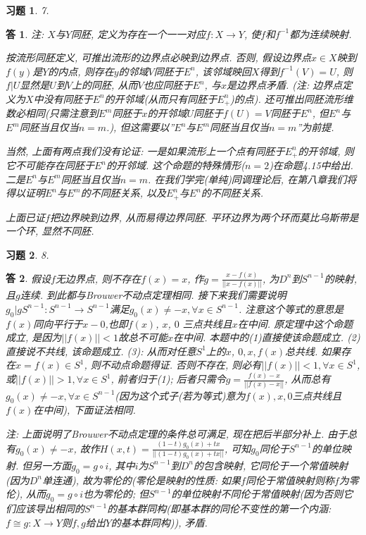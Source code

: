 \documentclass{ctexart}%
\newtheorem*{exercise}{习题}
\newtheorem*{solution}{答}
\theoremstyle{definition}
\theoremstyle{remark}
\begin{document}
\begin{exercise}7.
\end{exercise}
\begin{solution}
注: $X$与$Y$同胚, 定义为存在一个一一对应$f:X\rightarrow Y$, 使$f$和$f^{-1}$都为连续映射. 

按流形同胚定义, 可推出流形的边界点必映到边界点. 否则, 假设边界点$x\in X$映到$f(y)$是$Y$的内点, 则存在$y$的邻域$V$同胚于$E^n$, 该邻域映回$X$得到$f^{-1}(V)=U$, 则$f|U$显然是$U$到$V$上的同胚, 从而$V$也应同胚于$E^n$, 与$x$是边界点矛盾. (注: 边界点定义为$X$中没有同胚于$E^n$的开邻域(从而只有同胚于$E^n_+$)的点). 还可推出同胚流形维数必相同(只需注意到$E^m$同胚于$x$的开邻域$U$同胚于$f(U)=V$同胚于$E^n$, 但$E^n$与$E^m$同胚当且仅当$n=m$.), 但这需要以''$E^n$与$E^m$同胚当且仅当$n=m$''为前提.

当然, 上面有两点我们没有论证: 一是如果流形上一个点有同胚于$E^n_+$的开邻域, 则它不可能存在同胚于$E^n$的开邻域. 这个命题的特殊情形($n=2$)在命题4.15中给出. 二是$E^n$与$E^m$同胚当且仅当$n=m$. 在我们学完(单纯)同调理论后, 在第八章我们将得以证明$E^n$与$E^m$的不同胚关系, 以及$E^n_+$与$E^n$的不同胚关系. 

上面已证$f$把边界映到边界, 从而易得边界同胚. 平环边界为两个环而莫比乌斯带是一个环, 显然不同胚.
\end{solution}

\begin{exercise}8. 
\end{exercise}
\begin{solution}
假设$f$无边界点, 则不存在$f(x)=x$, 作$g=\frac{x-f(x)}{||x-f(x)||}$, 为$D^n$到$S^{n-1}$的映射, 且$g$连续. 到此都与Brouwer不动点定理相同. 接下来我们需要说明$g_0|gS^{n-1}:S^{n-1}\rightarrow S^{n-1}$满足$g_0(x)\neq -x, \forall x\in S^{n-1}$. 注意这个等式的意思是$f(x)$同向平行于$x-0$,也即$f(x)$, $x$, $0$
三点共线且$x$在中间. 原定理中这个命题成立, 是因为$||f(x)||<1$故总不可能$x$在中间. 本题中的(1)直接使该命题成立. (2)直接说不共线, 该命题成立. (3): 从而对任意$S^1$上的$x$, $0,x,f(x)$总共线. 如果存在$x=f(x)\in S^1$, 则不动点命题得证. 否则不存在, 则必有$||f(x)||<1,\forall x\in S^1$, 或$||f(x)||>1, \forall x\in S^1$, 前者归于(1); 后者只需令$g=\frac{f(x)-x}{||f(x)-x||}$, 从而总有$g_0(x)\neq -x, \forall x\in S^{n-1}$(因为这个式子(若为等式)意为$f(x),x,0$三点共线且$f(x)$在中间), 下面证法相同.

注: 上面说明了Brouwer不动点定理的条件总可满足, 现在把后半部分补上. 由于总有$g_0(x)\neq -x$, 故作$H(x,t)=\frac{(1-t)g_0(x)+tx}{||(1-t)g_0(x)+tx||}$, 可知$g_0$同伦于$S^{n-1}$的单位映射. 但另一方面$g_0=g\circ i$, 其中$i$为$S^{n-1}$到$D^n$的包含映射, 它同伦于一个常值映射(因为$D^n$单连通), 故为零伦的(零伦是映射的性质: 如果$f$同伦于常值映射则称$f$为零伦), 从而$g_0 = g\circ i$也为零伦的; 但$S^{n-1}$的单位映射不同伦于常值映射(因为否则它们应该导出相同的$S^{n-1}$的基本群同构(即基本群的同伦不变性的第一个内涵: $f\cong g:X\rightarrow Y$则$f,g$给出$Y$的基本群同构)), 矛盾.
\end{solution}
\end{document}
